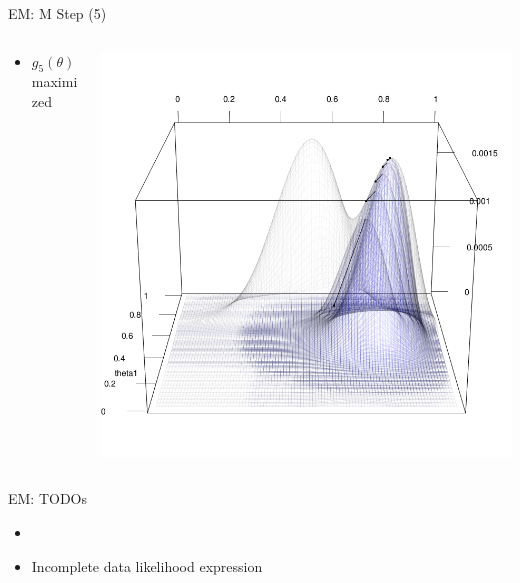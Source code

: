 \documentclass[dvipdfmx,bigger,aspectratio=169]{beamer}
\begin{document}
\begin{frame}[label={sec:org55b3b21}]{EM: M Step (5)}
\begin{columns}
\begin{column}{0.50\columnwidth}
\begin{itemize}
\item \(g_{5}(\theta)\) maximized
\end{itemize}
\end{column}
\begin{column}{0.50\columnwidth}
\begin{center}
\includegraphics[page=1,keepaspectratio,width=\textwidth,height=\textheight]{./source/em_rgl_g5_m.png}
\end{center}
\end{column}
\end{columns}
\end{frame}

\begin{frame}[label={sec:org152dfd7}]{EM: TODOs}
\begin{itemize}
\item 

\item Incomplete data likelihood expression
\end{itemize}
\end{frame}
\end{document}
